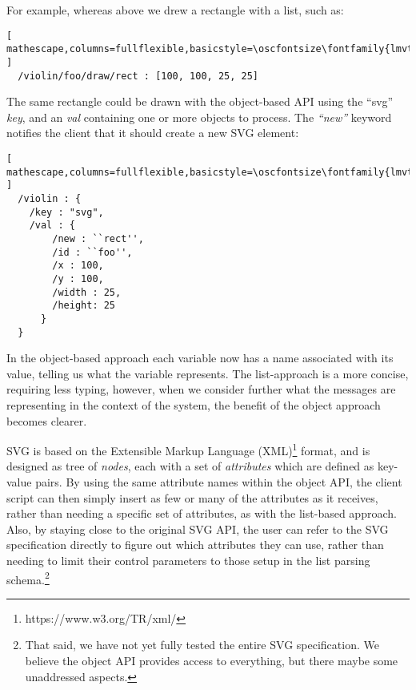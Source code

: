
For example, whereas above we drew a rectangle with a list, such as:
\begin{lstlisting}[ mathescape,columns=fullflexible,basicstyle=\oscfontsize\fontfamily{lmvtt}\selectfont ]
  /violin/foo/draw/rect : [100, 100, 25, 25]
\end{lstlisting}

\noindent
The same rectangle could be drawn with the object-based API using the ``svg'' \textit{key}, and an \textit{val} containing one or more objects to process. The \textit{``new''} keyword notifies the client that it should create a new SVG element:

\begin{minipage}{\linewidth}
\begin{lstlisting}[ mathescape,columns=fullflexible,basicstyle=\oscfontsize\fontfamily{lmvtt}\selectfont ]
  /violin : {
    /key : "svg",
    /val : {
        /new : ``rect'',
        /id : ``foo'',
        /x : 100,
        /y : 100,
        /width : 25,
        /height: 25
      }
  }
\end{lstlisting}
\end{minipage}

\noindent
In the object-based approach each variable now has a name associated with its value, telling us what the variable represents.
The list-approach is a more concise, requiring less typing, however, when we consider further what the messages are representing in the context of the \drawsocket system, the benefit of the object approach becomes clearer.

SVG is based on the Extensible Markup Language (XML)\footnote{https://www.w3.org/TR/xml/} format, and is designed as tree of \textit{nodes}, each with a set of \textit{attributes} which are defined as key-value pairs.
By using the same attribute names within the \drawsocket object API, the client script can then simply insert as few or many of the attributes as it receives, rather than needing a specific set of attributes, as with the list-based approach.
Also, by staying close to the original SVG API, the user can refer to the SVG specification directly to figure out which attributes they can use, rather than needing to limit their control parameters to those setup in the list parsing schema.\footnote{That said, we have not yet fully tested the entire SVG specification. We believe the object API provides access to everything, but there maybe some unaddressed aspects.} 


